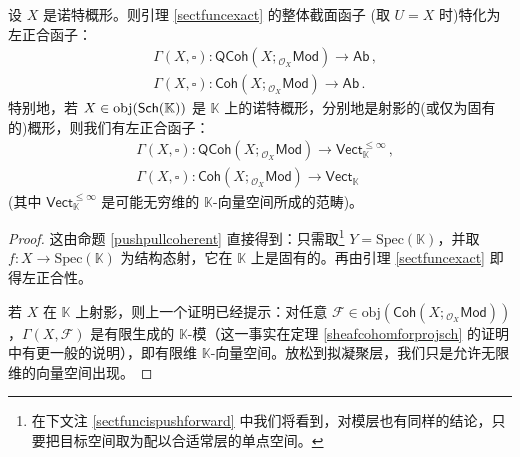 \begin{Cor}\label{globalsectforcoherent}
设 $X$ 是诺特概形。则引理 \ref{sectfuncexact} 的整体截面函子 \textup(取 $U=X$ 时\textup)特化为左正合函子：
\begin{equation}
	\begin{aligned}
		&\Gamma(X,\square): \mathsf{QCoh}(X;{}_{\mathcal{O}_X}\!\mathsf{Mod})\rightarrow\mathsf{Ab}\,, \\
		&\Gamma(X,\square):\mathsf{Coh}(X;{}_{\mathcal{O}_X}\!\mathsf{Mod})\rightarrow\mathsf{Ab}\,.
	\end{aligned}
\end{equation}
特别地，若 $X\in\textup{obj}(\mathsf{Sch}(\mathbb{K}))$ 是 $\mathbb{K}$ 上的诺特概形，分别地是射影的\textup(或仅为固有的\textup)概形，则我们有左正合函子：
\begin{equation}\label{globsectsfunconcoh}
	\begin{aligned}
		&\Gamma(X,\square):\mathsf{QCoh}(X;{}_{\mathcal{O}_X}\!\mathsf{Mod})\rightarrow\mathsf{Vect}_\mathbb{K}^{\leq\infty}\,, \\
		&\Gamma(X,\square):\mathsf{Coh}(X;{}_{\mathcal{O}_X}\!\mathsf{Mod})\rightarrow\mathsf{Vect}_\mathbb{K}
	\end{aligned}
\end{equation}
\textup(其中 $\mathsf{Vect}_\mathbb{K}^{\leq\infty}$ 是可能无穷维的 $\mathbb{K}$-向量空间所成的范畴\textup)。 
\end{Cor}

\begin{proof}
这由命题 \ref{pushpullcoherent} 直接得到：只需取\footnote{在下文注 \ref{sectfuncispushforward} 中我们将看到，对模层也有同样的结论，只要把目标空间取为配以合适常层的单点空间。} $Y=\text{Spec}(\mathbb{K})$，并取 $f:X\rightarrow \text{Spec}(\mathbb{K})$ 为结构态射，它在 $\mathbb{K}$ 上是固有的。再由引理 \ref{sectfuncexact} 即得左正合性。 

若 $X$ 在 $\mathbb{K}$ 上射影，则上一个证明已经提示：对任意 $\mathcal{F}\in\text{obj}(\mathsf{Coh}(X;{}_{\mathcal{O}_X}\!\mathsf{Mod}))$，$\Gamma(X,\mathcal{F})$ 是有限生成的 $\mathbb{K}$-模（这一事实在定理 \ref{sheafcohomforprojsch} 的证明中有更一般的说明），即有限维 $\mathbb{K}$-向量空间。放松到拟凝聚层，我们只是允许无限维的向量空间出现。
\end{proof}


\newpage
\pagestyle{fancy}

